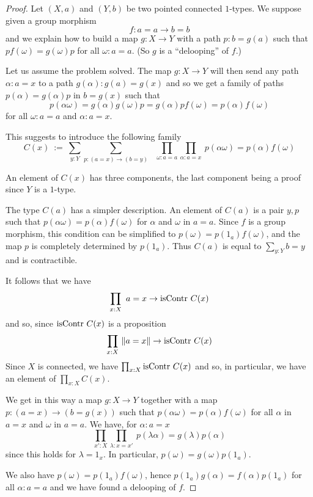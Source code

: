 \begin{proof}
  Let $(X,a)$ and $(Y,b)$ be two pointed connected $1$-types.
We suppose given a group morphism
$$f:a = a\rightarrow b = b$$
and we explain how to build a map $g:X \rightarrow Y$ with
a path $p:b = g(a)$ such that $p f(\omega) = g(\omega) p$
for all $\omega:a = a$. (So $g$ is a ``delooping'' of $f$.)

\medskip

Let us assume the problem solved. The map $g:X\rightarrow Y$
will then send any path $\alpha:a = x$ to a path $g(\alpha):g(a) = g(x)$
and so we get a family of paths $p(\alpha) = g(\alpha) p$ in $b = g(x)$ such that
$$p(\alpha\omega) = g(\alpha)g(\omega)p
  = g(\alpha)pf(\omega) = p(\alpha)f(\omega)$$
for all $\omega:a = a$ and $\alpha : a = x$.

\medskip

This suggests to introduce the following family
$$
C(x)~:=~ \sum_{y:Y}\sum_{p:(a=x)\rightarrow (b = y)}~~~\prod_{\omega:a=a}\prod_{\alpha:a=x}~
 p(\alpha\omega) = p(\alpha)f(\omega)
$$

 An element of $C(x)$ has three components, the last component being
 a proof since $Y$ is a $1$-type.

 The type $C(a)$ has a simpler description. An element of $C(a)$ is
 a pair $y,p$ such that $p(\alpha\omega) = p(\alpha)f(\omega)$ for
 $\alpha$ and $\omega$ in $a=a$. Since $f$ is a group morphism, this condition
 can be simplified to $p(\omega) = p(1_a)f(\omega)$, and the map $p$
 is completely determined by $p(1_a)$.
 Thus $C(a)$ is equal to $\sum_{y:Y}b = y$ and is contractible.

 \medskip

 It follows that we have
 $$
 \prod_{x:X}~ a = x\rightarrow\mathrm{isContr}~ C(x)
 $$
and so, since $\mathrm{isContr}~C(x)$ is a proposition
 $$
 \prod_{x:X}~ \lVert a = x\rVert\rightarrow\mathrm{isContr}~ C(x)
 $$
 Since $X$ is connected, we have
 $\prod_{x:X}\mathrm{isContr}~ C(x)$
 and so, in particular, we have an element of $\prod_{x:X}C(x)$.

 We get in this way a map $g:X\rightarrow Y$
 together with a map $p:(a=x)\rightarrow (b = g(x))$ such that
 $p (\alpha\omega) = p(\alpha) f(\omega)$
 for all $\alpha$ in $a=x$ and $\omega$ in $a=a$.
We have, for $\alpha:a=x$
$$\prod_{x':X}\prod_{\lambda:x=x'}~p(\lambda\alpha) = g(\lambda)p(\alpha)$$
since this holds for $\lambda = 1_x$.
In particular, $p(\omega) = g(\omega)p(1_a)$.

We also have $p(\omega) = p(1_a)f(\omega)$, hence 
$p(1_a)g(\alpha) =  f(\alpha)p(1_a)$
for all $\alpha:a=a$ and we have found a delooping of $f$.
\end{proof}


